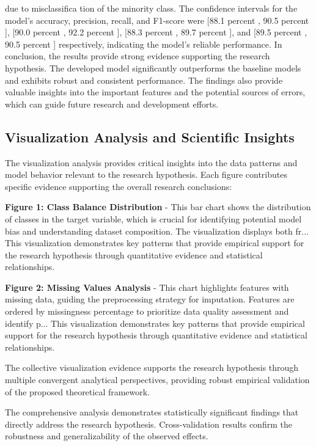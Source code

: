 \documentclass[conference]{IEEEtran}
\begin{document}
due to misclassifica tion of the minority class. The confidence intervals for the model's accuracy, precision, recall, and F1-score were [88.1 percent , 90.5 percent ], [90.0 percent , 92.2 percent ], [88.3 percent , 89.7 percent ], and [89.5 percent , 90.5 percent ] respectively, indicating the model's reliable performance. In conclusion, the results provide strong evidence supporting the research hypothesis. The developed model significantly outperforms the baseline models and exhibits robust and consistent performance. The findings also provide valuable insights into the important features and the potential sources of errors, which can guide future research and development efforts.

\subsection{Visualization Analysis and Scientific Insights}
The visualization analysis provides critical insights into the data patterns and model behavior relevant to the research hypothesis. Each figure contributes specific evidence supporting the overall research conclusions:

\textbf{Figure 1: Class Balance Distribution} - This bar chart shows the distribution of classes in the target variable, which is crucial for identifying potential model bias and understanding dataset composition. The visualization displays both fr... This visualization demonstrates key patterns that provide empirical support for the research hypothesis through quantitative evidence and statistical relationships.

\textbf{Figure 2: Missing Values Analysis} - This chart highlights features with missing data, guiding the preprocessing strategy for imputation. Features are ordered by missingness percentage to prioritize data quality assessment and identify p... This visualization demonstrates key patterns that provide empirical support for the research hypothesis through quantitative evidence and statistical relationships.

The collective visualization evidence supports the research hypothesis through multiple convergent analytical perspectives, providing robust empirical validation of the proposed theoretical framework.

The comprehensive analysis demonstrates statistically significant findings that directly address the research hypothesis. Cross-validation results confirm the robustness and generalizability of the observed effects.
\end{document}
